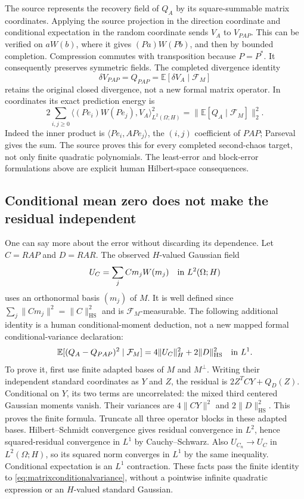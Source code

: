 \documentclass[11pt]{article}
\newcommand{\E}{\mathbb E}
\newcommand{\HS}{\mathrm{HS}}
\begin{document}
The source represents the recovery field of $Q_A$ by its square-summable
matrix coordinates. Applying the source projection in the direction
coordinate and conditional expectation in the random coordinate sends
$V_A$ to $V_{PAP}$. This can be verified on $aW(b)$, where it gives
$(Pa)W(Pb)$, and then by bounded completion. Compression commutes with
transposition because $P=P^*$. It consequently preserves symmetric
fields. The completed divergence identity
\[
 \delta V_{PAP}=Q_{PAP}=\E[\delta V_A\mid\mathcal F_M]
\]
retains the original closed divergence, not a new formal matrix operator.
In coordinates its exact prediction energy is
\[
 2\sum_{i,j\geq0}
 \big\langle (Pe_i)W(Pe_j),V_A\big\rangle_{L^2(\Omega;H)}^2
 =\|\E[Q_A\mid\mathcal F_M]\|_2^2.
\]
Indeed the inner product is $\langle Pe_i,A Pe_j\rangle$, the
$(i,j)$ coefficient of $PAP$; Parseval gives the sum. The source
proves this for every completed second-chaos target, not only finite
quadratic polynomials. The least-error and block-error formulations
above are explicit human Hilbert-space consequences.

\subsection*{Conditional mean zero does not make the residual independent}
One can say more about the error without discarding its dependence.
Let $C=RAP$ and $D=RAR$. The observed $H$-valued Gaussian field
\[
 U_C=\sum_j C m_j W(m_j)\quad\hbox{in }L^2(\Omega;H)
\]
uses an orthonormal basis $(m_j)$ of $M$. It is well defined since
$\sum_j\|Cm_j\|^2=\|C\|_{\HS}^2$ and is $\mathcal F_M$-measurable.
The following additional identity is a human conditional-moment
deduction, not a new mapped formal conditional-variance declaration:
\begin{equation}\label{eq:matrixconditionalvariance}
 \E[(Q_A-Q_{PAP})^2\mid\mathcal F_M]
 =4\|U_C\|_H^2+2\|D\|_{\HS}^2\quad\hbox{in }L^1.
\end{equation}
To prove it, first use finite adapted bases of $M$ and $M^\perp$.
Writing their independent standard coordinates as $Y$ and $Z$, the
residual is $2Z^TCY+Q_D(Z)$. Conditional on $Y$, its two terms are
uncorrelated: the mixed third centered Gaussian moments vanish.
Their variances are $4\|CY\|^2$ and $2\|D\|_{\HS}^2$.
This proves the finite formula. Truncate all three operator blocks in
these adapted bases. Hilbert--Schmidt convergence gives residual
convergence in $L^2$, hence squared-residual convergence in $L^1$ by
Cauchy--Schwarz. Also $U_{C_n}\to U_C$ in $L^2(\Omega;H)$, so its
squared norm converges in $L^1$ by the same inequality. Conditional
expectation is an $L^1$ contraction. These facts pass the finite
identity to \eqref{eq:matrixconditionalvariance}, without a pointwise
infinite quadratic expression or an $H$-valued standard Gaussian.
\end{document}
